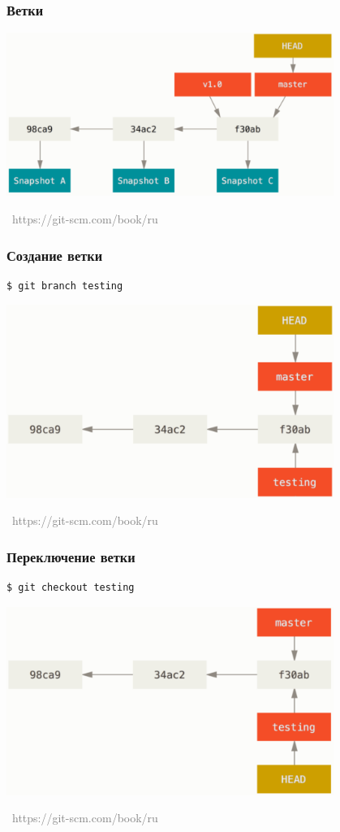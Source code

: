 \documentclass[xetex,mathserif,serif]{beamer}
\newcommand{\attribution}[1] {
\vspace{-5mm}\begin{flushright}\begin{scriptsize}\textcolor{gray}{\textcopyright\, #1}\end{scriptsize}\end{flushright}
}
\begin{document}
	\begin{frame}
		\frametitle{Ветки}
		\begin{center}
			\includegraphics[width=0.8\textwidth]{branches.png}
			\attribution{https://git-scm.com/book/ru}
		\end{center}
	\end{frame}

	\begin{frame}[fragile]
		\frametitle{Создание ветки}
		\begin{verbatim}
$ git branch testing
		\end{verbatim}
		\begin{center}
			\includegraphics[width=0.8\textwidth]{creatingBranch.png}
			\attribution{https://git-scm.com/book/ru}
		\end{center}
	\end{frame}

	\begin{frame}[fragile]
		\frametitle{Переключение ветки}
		\begin{verbatim}
$ git checkout testing
		\end{verbatim}
		\begin{center}
			\includegraphics[width=0.8\textwidth]{checkout.png}
			\attribution{https://git-scm.com/book/ru}
		\end{center}
	\end{frame}
\end{document}
